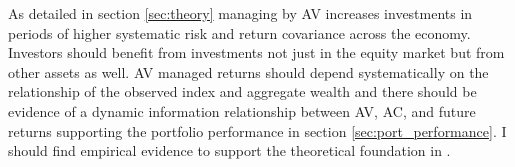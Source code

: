 

As detailed in section \ref{sec:theory} managing by AV increases investments in periods of higher systematic risk and return covariance across the economy. Investors should benefit from investments not just in the equity market but from other assets as well. AV managed returns should depend systematically on the relationship of the observed index and aggregate wealth and there should be evidence of a dynamic information relationship between AV, AC, and future returns supporting the portfolio performance in section \ref{sec:port_performance}. I should find empirical evidence to support the theoretical foundation in \cite{pollet_average_2010}.